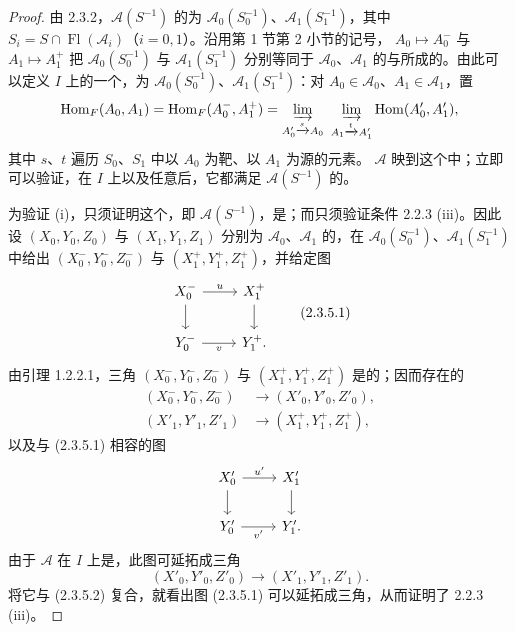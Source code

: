 \begin{proof}
由 2.3.2，$\mathcal A(S^{-1})$ 的为 $\mathcal A_0(S_0^{-1})$、$\mathcal A_1(S_1^{-1})$，其中 $S_i=S\cap\operatorname{Fl}(\mathcal A_i)$（$i=0,1$）。沿用第 1 节第 2 小节的记号， $A_0\mapsto A_0^-$ 与 $A_1\mapsto A_1^+$ 把 $\mathcal A_0(S_0^{-1})$ 与 $\mathcal A_1(S_1^{-1})$ 分别等同于 $\mathcal A_0$、$\mathcal A_1$ 的与所成的。由此可以定义 $I$ 上的一个，为 $\mathcal A_0(S_0^{-1})$、$\mathcal A_1(S_1^{-1})$：对 $A_0\in\mathcal A_0$、$A_1\in\mathcal A_1$，置
\[
\operatorname{Hom}_F(A_0,A_1)=\operatorname{Hom}_F(A_0^-,A_1^+)
=\varinjlim_{A'_0\xrightarrow{s}A_0}\ \varinjlim_{A_1\xrightarrow{t}A'_1}\operatorname{Hom}(A'_0,A'_1),
\]
其中 $s$、$t$ 遍历 $S_0$、$S_1$ 中以 $A_0$ 为靶、以 $A_1$ 为源的元素。 $\mathcal A$ 映到这个中；立即可以验证，在 $I$ 上以及任意后，它都满足 $\mathcal A(S^{-1})$ 的。

为验证 (i)，只须证明这个，即 $\mathcal A(S^{-1})$，是；而只须验证条件 2.2.3 (iii)。因此设 $(X_0,Y_0,Z_0)$ 与 $(X_1,Y_1,Z_1)$ 分别为 $\mathcal A_0$、$\mathcal A_1$ 的，在 $\mathcal A_0(S_0^{-1})$、$\mathcal A_1(S_1^{-1})$ 中给出 $(X_0^-,Y_0^-,Z_0^-)$ 与 $(X_1^+,Y_1^+,Z_1^+)$，并给定图
\[
\begin{tikzcd}
X_0^-\arrow[r,"u"]\arrow[d]&X_1^+\arrow[d]\\
Y_0^-\arrow[r,"v"']&Y_1^+.
\end{tikzcd}\tag{2.3.5.1}
\]
由引理 1.2.2.1，三角 $(X_0^-,Y_0^-,Z_0^-)$ 与 $(X_1^+,Y_1^+,Z_1^+)$ 是的；因而存在的
\[
\begin{aligned}
(X_0^-,Y_0^-,Z_0^-)&\longrightarrow(X'_0,Y'_0,Z'_0),\\
(X'_1,Y'_1,Z'_1)&\longrightarrow(X_1^+,Y_1^+,Z_1^+),
\end{aligned}\tag{2.3.5.2}
\]
以及与 (2.3.5.1) 相容的图
\[
\begin{tikzcd}
X'_0\arrow[r,"u'"]\arrow[d]&X'_1\arrow[d]\\
Y'_0\arrow[r,"v'"']&Y'_1.
\end{tikzcd}
\]
由于 $\mathcal A$ 在 $I$ 上是，此图可延拓成三角
\[
(X'_0,Y'_0,Z'_0)\longrightarrow(X'_1,Y'_1,Z'_1).
\]
将它与 (2.3.5.2) 复合，就看出图 (2.3.5.1) 可以延拓成三角，从而证明了 2.2.3 (iii)。


\end{proof}
